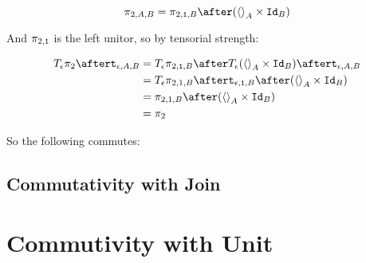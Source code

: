 \documentclass{report}
\begin{document}
    $$\pi_{2, A, B} = \pi_{2, \1, B} \after (\term{A} \times \Id{B})$$

    And $\pi_{2, \texttt{1}}$ is the left unitor, so by tensorial strength:
    
    \begin{equation}
        \begin{split}
            \T{\e}{\pp} \after \tstrength{\e}{A}{B} & = \T{\e}{\pi_{2, \1, B}} \after \T{\e}{(\term{A} \times \Id{B})} \after \tstrength{\e}{A}{B} \\
            & = \T{\e}{\pi_{2, 1, B}} \after \tstrength{\e}{\1}{B} \after (\term{A} \times \Id{B}) \\
            & = \pi_{2,1,B} \after (\term{A} \times \Id{B}) \\
            & = \pp
        \end{split}
    \end{equation}

So the following commutes:



\subsection{Commutativity with Join}

\section{Commutivity with Unit}

\end{document}

